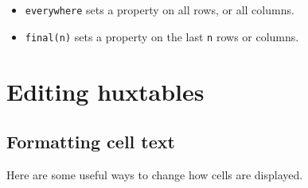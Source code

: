 \documentclass[]{article}
\newenvironment{Shaded}{\begin{snugshade}}{\end{snugshade}}
\newcommand{\CommentTok}[1]{\textcolor[rgb]{0.56,0.35,0.01}{\textit{#1}}}
\newcommand{\DecValTok}[1]{\textcolor[rgb]{0.00,0.00,0.81}{#1}}
\newcommand{\KeywordTok}[1]{\textcolor[rgb]{0.13,0.29,0.53}{\textbf{#1}}}
\newcommand{\NormalTok}[1]{#1}
\newcommand{\OperatorTok}[1]{\textcolor[rgb]{0.81,0.36,0.00}{\textbf{#1}}}
\newcommand{\StringTok}[1]{\textcolor[rgb]{0.31,0.60,0.02}{#1}}
\begin{document}
\begin{itemize}
\item
  \texttt{everywhere} sets a property on all rows, or all columns.

\begin{Shaded}
\end{Shaded}

  \FloatBarrier
\item
  \texttt{final(n)} sets a property on the last \texttt{n} rows or
  columns.

\begin{Shaded}
\end{Shaded}

  \FloatBarrier
\end{itemize}

\hypertarget{editing-huxtables}{%
\section{Editing huxtables}\label{editing-huxtables}}

\hypertarget{formatting-cell-text}{%
\subsection{Formatting cell text}\label{formatting-cell-text}}

Here are some useful ways to change how cells are displayed.
\end{document}

